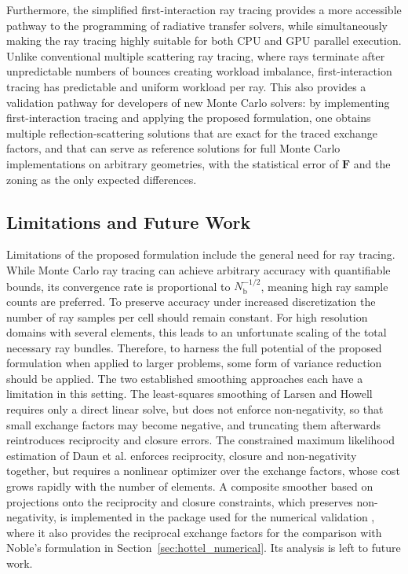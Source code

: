 \documentclass[preprint,1p,times]{elsarticle}
\theoremstyle{plain}
\theoremstyle{definition}
\theoremstyle{remark}
\begin{document}
Furthermore, the simplified first-interaction ray tracing provides a more accessible pathway to the programming of radiative transfer solvers, while simultaneously making the ray tracing highly suitable for both CPU and GPU parallel execution. Unlike conventional multiple scattering ray tracing, where rays terminate after unpredictable numbers of bounces creating workload imbalance, first-interaction tracing has predictable and uniform workload per ray. This also provides a validation pathway for developers of new Monte Carlo solvers: by implementing first-interaction tracing and applying the proposed formulation, one obtains multiple reflection-scattering solutions that are exact for the traced exchange factors, and that can serve as reference solutions for full Monte Carlo implementations on arbitrary geometries, with the statistical error of $\mathbf{F}$ and the zoning as the only expected differences.

\subsection{Limitations and Future Work}
\label{sec:limitations}

Limitations of the proposed formulation include the general need for ray tracing. While Monte Carlo ray tracing can achieve arbitrary accuracy with quantifiable bounds, its convergence rate is proportional to $N_\mathrm{b}^{-1/2}$, meaning high ray sample counts are preferred. To preserve accuracy under increased discretization the number of ray samples per cell should remain constant. For high resolution domains with several elements, this leads to an unfortunate scaling of the total necessary ray bundles. Therefore, to harness the full potential of the proposed formulation when applied to larger problems, some form of variance reduction should be applied. The two established smoothing approaches each have a limitation in this setting. The least-squares smoothing of Larsen and Howell \citep{LarsenHowell1986} requires only a direct linear solve, but does not enforce non-negativity, so that small exchange factors may become negative, and truncating them afterwards reintroduces reciprocity and closure errors. The constrained maximum likelihood estimation of Daun et al. \citep{Daun2005} enforces reciprocity, closure and non-negativity together, but requires a nonlinear optimizer over the exchange factors, whose cost grows rapidly with the number of elements. A composite smoother based on projections onto the reciprocity and closure constraints, which preserves non-negativity, is implemented in the package used for the numerical validation \citep{Bielefeld2024}, where it also provides the reciprocal exchange factors for the comparison with Noble's formulation in Section~\ref{sec:hottel_numerical}. Its analysis is left to future work.
\end{document}
